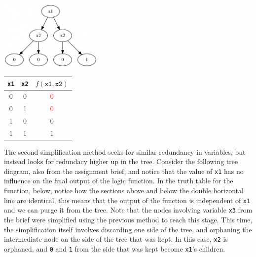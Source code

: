 \documentclass[12pt]{article}
\begin{document}
    \begin{minipage}{\linewidth}
        \begin{multicols}{2}
            \begin{center} \null \vfill %
                \includegraphics[width=5cm, interpolate]{rsc/bt1.png}
                \parbox{\linewidth}{} 

                \columnbreak
                \null \vfill

                \begin{tabular}[t]{ c|c|c }
                    \texttt{x1} & \texttt{x2}   & $f(\texttt{x1},\texttt{x2})$ \\ \hline
                    0           & 0             & \textcolor{red}{0} \\
                    0           & 1             & \textcolor{red}{0} \\
                    1           & 0             & 0 \\
                    1           & 1             & 1
                \end{tabular} \null \vspace{2ex}
                \parbox{\linewidth}{} 
            \end{center}
        \end{multicols}
    \end{minipage}

    The second simplification method seeks for similar redundancy in variables, but instead looks for redundacy higher up in the tree. Consider the following tree diagram, also from the assignment brief, and notice that the value of \texttt{x1} has no influence on the final output of the logic function.
    In the truth table for the function, below, notice how the sections above and below the double horizontal line are identical, this means that the output of the function is independent of \texttt{x1} and we can purge it from the tree. Note that the nodes involving variable \texttt{x3} from the brief were simplified using the previous method to reach this stage. This time, the simplification itself involves discarding one side of the tree, and orphaning the intermediate node on the side of the tree that was kept. In this case, \texttt{x2} is orphaned, and \texttt{0} and \texttt{1} from the side that was kept become \texttt{x1}'s children.
    
\end{document}
